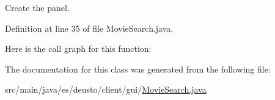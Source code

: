 Create the panel. 

Definition at line 35 of file Movie\+Search.\+java.

Here is the call graph for this function\+:


The documentation for this class was generated from the following file\+:\begin{DoxyCompactItemize}
\item 
src/main/java/es/deusto/client/gui/\mbox{\hyperlink{_movie_search_8java}{Movie\+Search.\+java}}\end{DoxyCompactItemize}
